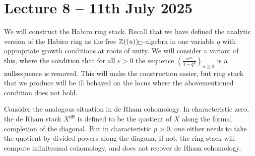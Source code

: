 \section{Lecture 8 -- 11th July 2025}\label{sec: lecture 8}
We will construct the Habiro ring stack. Recall that we have defined the analytic version of the Habiro ring  as the free $\mathbb{Z}((u))_{\square}$-algebra in one variable $q$ with appropriate growth conditions at roots of unity. We will consider a variant of this, where the condition that for all $\varepsilon>0$ the sequence $\left(\frac{u^{\varepsilon n}}{1-q^{n}}\right)_{n\geq0}$ is a nullsequence is removed. This will make the construction easier, but ring stack that we produce will be ill behaved on the locus where the abovementioned condition does not hold. 

Consider the analogous situation in de Rham cohomology. In characteristic zero, the de Rham stack $X^{\mathsf{dR}}$ is defined to be the quotient of $X$ along the formal completion of the diagonal. But in characteristic $p>0$, one either needs to take the quotient by divided powers along the diagona. If not, the ring stack will compute infinitesmal cohomology, and does not recover de Rham cohomology. 

